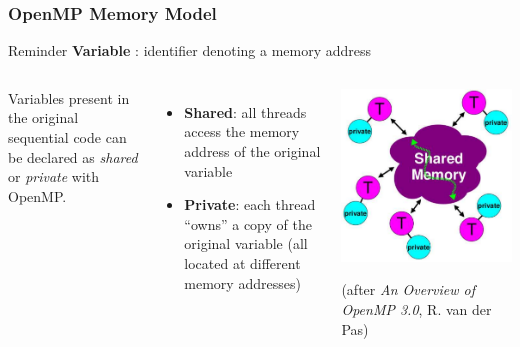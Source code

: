 \documentclass{beamer}
\begin{document}
\begin{frame}
  \frametitle{OpenMP Memory Model}

  \begin{block}{Reminder}
    \textbf{Variable} : \alert{identifier} denoting a \alert{memory address}
  \end{block}
  
  \begin{columns}[t]

    Variables present in the original sequential code can be declared as {\it shared}
    or {\it private} with OpenMP.

    \medskip
    
    \begin{itemize}
    \item \textbf{Shared}: all threads access the memory address of the original variable 

    \item \textbf{Private}: each thread ``owns'' a \alert{copy} %
      of the original variable (all located at different memory addresses)
    \end{itemize}
    
    \begin{center}
      \includegraphics[width=\textwidth]{modele_mem_OpenMP}    

      {\tiny (after {\it An Overview of OpenMP 3.0}, R. van der Pas)} 
    \end{center}
  \end{columns}


\end{frame}
\end{document}

